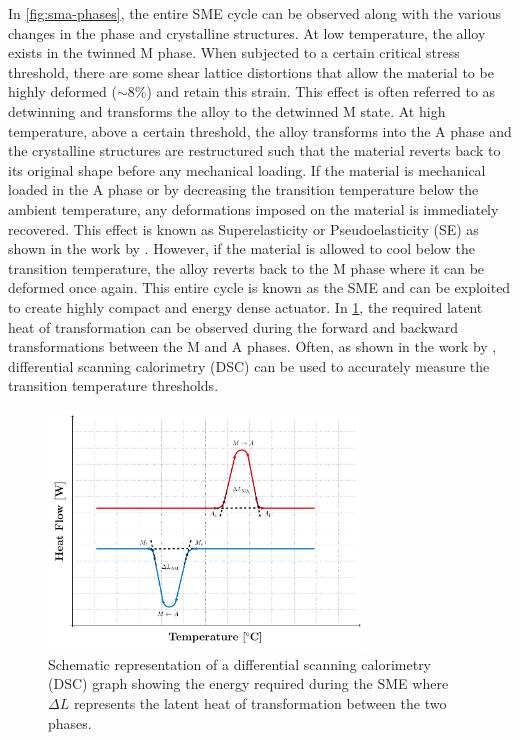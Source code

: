 In \cref{fig:sma-phases}, the entire SME cycle can be observed along with the various changes in the phase and crystalline structures. At low temperature, the alloy exists in the twinned M phase. When subjected to a certain critical stress threshold, there are some shear lattice distortions that allow the material to be highly deformed ($\sim8$\%) and retain this strain. This effect is often referred to as detwinning and transforms the alloy to the detwinned M state. At high temperature, above a certain threshold, the alloy transforms into the A phase and the crystalline structures are restructured such that the material reverts back to its original shape before any mechanical loading. If the material is mechanical loaded in the A phase or by decreasing the transition temperature below the ambient temperature, any deformations imposed on the material is immediately recovered. This effect is known as Superelasticity or Pseudoelasticity (SE) as shown in the work by \todocite. However, if the material is allowed to cool below the transition temperature, the alloy reverts back to the M phase where it can be deformed once again. This entire cycle is known as the SME and can be exploited to create highly compact and energy dense actuator. In \cref{fig:dsc-graph}, the required latent heat of transformation can be observed during the forward and backward transformations between the M and A phases. Often, as shown in the work by \todocite, differential scanning calorimetry (DSC) can be used to accurately measure the transition temperature thresholds.

\begin{figure}[hbt]
    \centering
    \includegraphics[width=0.75\textwidth]{images/chap2/dsc-graph.pdf}
    \caption{Schematic representation of a differential scanning calorimetry (DSC) graph showing the energy required during the SME where $\Delta L$ represents the latent heat of transformation between the two phases.}
    \label{fig:dsc-graph}
\end{figure}

